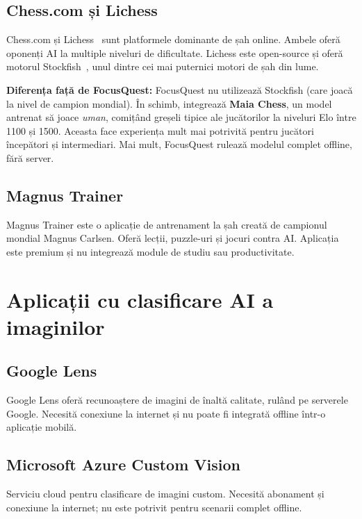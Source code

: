 \documentclass[12pt, a4paper, twoside]{report}
\numberwithin{equation}{section}
\begin{document}
\subsection{Chess.com și Lichess}

Chess.com și Lichess~\cite{lichess} sunt platformele dominante de șah online. Ambele oferă oponenți AI
la multiple niveluri de dificultate. Lichess este open-source și oferă motorul Stockfish~\cite{stockfish},
unul dintre cei mai puternici motori de șah din lume.

\textbf{Diferența față de FocusQuest:} FocusQuest nu utilizează Stockfish (care joacă la
nivel de campion mondial). În schimb, integrează \textbf{Maia Chess}, un model antrenat să
joace \textit{uman}, comițând greșeli tipice ale jucătorilor la niveluri Elo între 1100 și 1500.
Aceasta face experiența mult mai potrivită pentru jucători începători și intermediari.
Mai mult, FocusQuest rulează modelul complet offline, fără server.

\subsection{Magnus Trainer}

Magnus Trainer este o aplicație de antrenament la șah creată de campionul mondial Magnus
Carlsen. Oferă lecții, puzzle-uri și jocuri contra AI. Aplicația este premium și nu
integrează module de studiu sau productivitate.

\section{Aplicații cu clasificare AI a imaginilor}

\subsection{Google Lens}

Google Lens oferă recunoaștere de imagini de înaltă calitate, rulând pe serverele Google.
Necesită conexiune la internet și nu poate fi integrată offline într-o aplicație mobilă.

\subsection{Microsoft Azure Custom Vision}

Serviciu cloud pentru clasificare de imagini custom. Necesită abonament și conexiune la
internet; nu este potrivit pentru scenarii complet offline.
\end{document}
